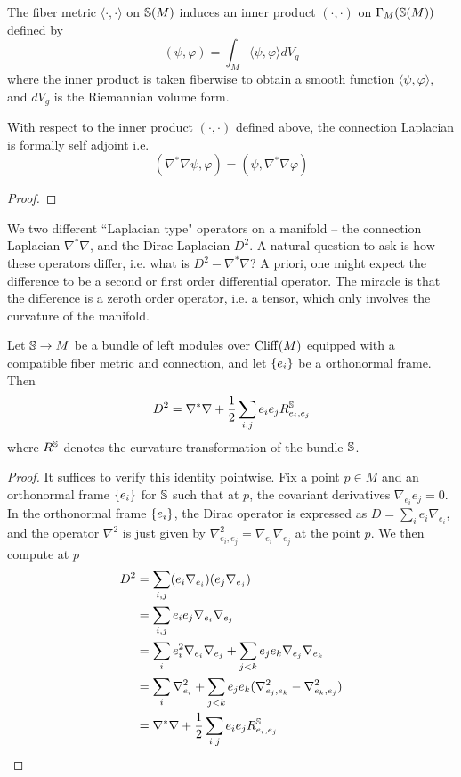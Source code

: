 %
The fiber metric $\langle\cdot,\cdot\rangle$ on $\S(M)$ induces an inner product
$(\cdot,\cdot)$ on $\Gamma_M(\S(M))$ defined by
\[
(\psi, \varphi) = \int_M \langle \psi, \varphi \rangle dV_g
\]
where the inner product is taken fiberwise to obtain a smooth function
$\langle \psi,\varphi\rangle$, and $dV_g$ is the Riemannian volume form.
%
\begin{prop}
With respect to the inner product $(\cdot,\cdot)$ defined above, the connection
Laplacian is formally self adjoint i.e.
\[
(\nabla^*\nabla \psi, \varphi) = (\psi, \nabla^*\nabla\varphi)
\]
\end{prop}
%
\begin{proof} %

\end{proof}
%
We two different ``Laplacian type" operators on a manifold -- the connection
Laplacian $\nabla^*\nabla$, and the Dirac Laplacian $D^2$. A natural question
to ask is how these operators differ, i.e. what is $D^2 - \nabla^*\nabla$? A priori,
one might expect the difference to be a second or first order differential operator.
The miracle is that the difference is a zeroth order operator, i.e. a tensor, which
only involves the curvature of the manifold.
%
\begin{thm}
Let $\S \to M$ be a bundle of left modules over $\Cliff(M)$ equipped with a compatible
fiber metric and connection, and let $\set{e_i}$ be a orthonormal frame. Then
\[
D^2 = \nabla^*\nabla + \frac{1}{2}\sum_{i, j} e_i e_j R^\S_{e_i, e_j}
\]
where $R^\S$ denotes the curvature transformation of the bundle $\S$.
\end{thm}
%
\begin{proof}
It suffices to verify this identity pointwise. Fix a point $p \in M$ and an orthonormal
frame $\set{e_i}$ for $\S$ such that at $p$, the covariant derivatives
$\nabla_{e_i}e_j = 0$. In the orthonormal frame $\set{e_i}$, the Dirac operator is
expressed as $D = \sum_i e_i\nabla_{e_i}$, and the operator $\nabla^2$ is just given
by $\nabla^2_{e_i,e_j} = \nabla_{e_i}\nabla_{e_j}$ at the point $p$. We then compute at
$p$
\begin{align*}
D^2 &= \sum_{i,j}(e_i\nabla_{e_i})(e_j\nabla_{e_j}) \\
&= \sum_{i,j} e_ie_j\nabla_{e_i}\nabla_{e_j} \\
&= \sum_i e_i^2\nabla_{e_i}\nabla_{e_j} + \sum_{j < k} e_j e_k\nabla_{e_j}\nabla_{e_k} \\
&= \sum_i \nabla^2_{e_i}
+ \sum_{j < k} e_je_k (\nabla^2_{e_j, e_k} - \nabla^2_{e_k, e_j}) \\
&= \nabla^*\nabla + \frac{1}{2}\sum_{i, j} e_i e_j R^\S_{e_i, e_j}
\end{align*}
\end{proof}
